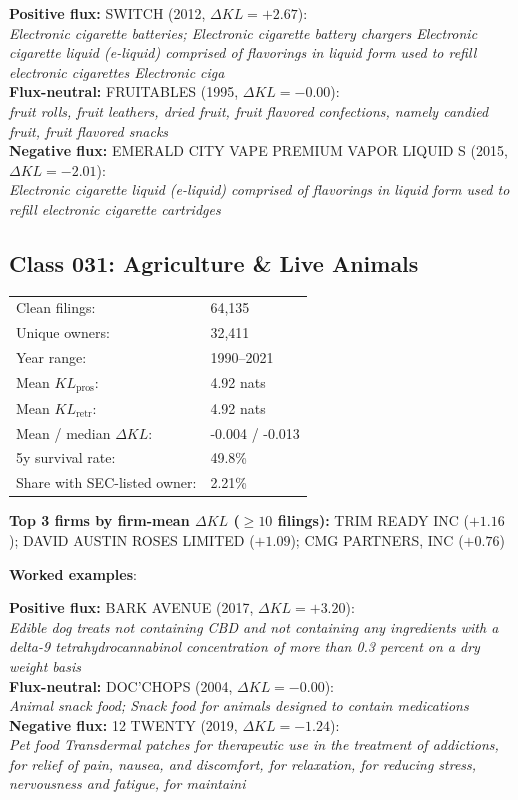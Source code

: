   \textbf{Positive flux:} \textsc{SWITCH} (2012, $\Delta KL=+2.67$):\\
  \textit{Electronic cigarette batteries; Electronic cigarette battery chargers Electronic cigarette liquid (e-liquid) comprised of flavorings in liquid form used to refill electronic cigarettes Electronic ciga}\\
  \textbf{Flux-neutral:} \textsc{FRUITABLES} (1995, $\Delta KL=-0.00$):\\
  \textit{fruit rolls, fruit leathers, dried fruit, fruit flavored confections, namely candied fruit, fruit flavored snacks}\\
  \textbf{Negative flux:} \textsc{EMERALD CITY VAPE PREMIUM VAPOR LIQUID S} (2015, $\Delta KL=-2.01$):\\
  \textit{Electronic cigarette liquid (e-liquid) comprised of flavorings in liquid form used to refill electronic cigarette cartridges}\\

\subsection*{Class 031: Agriculture \& Live Animals}
\label{app:industry-031}

\begin{tabular}{ll}
Clean filings: & 64,135 \\
Unique owners: & 32,411 \\
Year range: & 1990--2021 \\
Mean $KL_\text{pros}$: & 4.92 nats \\
Mean $KL_\text{retr}$: & 4.92 nats \\
Mean / median $\Delta KL$: & -0.004 / -0.013 \\
5y survival rate: & 49.8\% \\
Share with SEC-listed owner: & 2.21\% \\
\end{tabular}

\textbf{Top 3 firms by firm-mean $\Delta KL$ ($\geq 10$ filings):} TRIM READY INC ($+1.16$); DAVID AUSTIN ROSES LIMITED ($+1.09$); CMG PARTNERS, INC ($+0.76$)

\textbf{Worked examples}:

  \textbf{Positive flux:} \textsc{BARK AVENUE} (2017, $\Delta KL=+3.20$):\\
  \textit{Edible dog treats not containing CBD and not containing any ingredients with a delta-9 tetrahydrocannabinol concentration of more than 0.3 percent on a dry weight basis}\\
  \textbf{Flux-neutral:} \textsc{DOC'CHOPS} (2004, $\Delta KL=-0.00$):\\
  \textit{Animal snack food; Snack food for animals designed to contain medications}\\
  \textbf{Negative flux:} \textsc{12 TWENTY} (2019, $\Delta KL=-1.24$):\\
  \textit{Pet food Transdermal patches for therapeutic use in the treatment of addictions, for relief of pain, nausea, and discomfort, for relaxation, for reducing stress, nervousness and fatigue, for maintaini}\\

